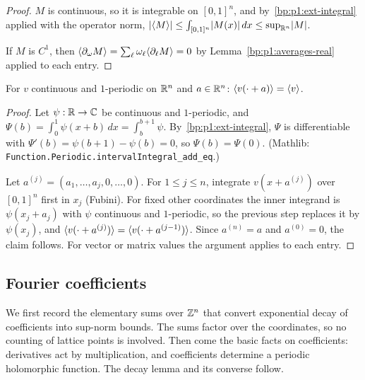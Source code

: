 \begin{proof}
\label{step:p1:am-bound}
$M$ is continuous, so it is integrable on $[0,1]^n$, and by~\ref{bp:p1:ext-integral} applied with the
operator norm, $\lvert \langle M\rangle\rvert\le\int_{[0,1]^n}\lvert M(x)\rvert\,dx\le\sup_{\mathbb{R}^n}\lvert M\rvert$.

\label{step:p1:am-derivative}
If $M$ is $C^1$, then $\langle \partial_\omega M\rangle=\sum_\ell\omega_\ell\langle \partial_\ell M\rangle=0$ by
Lemma~\ref{bp:p1:averages-real} applied to each entry.
\end{proof}

\begin{lemma}\label{bp:p1:periodic-average}
For $v$ continuous and $1$-periodic on $\mathbb{R}^n$ and $a\in\mathbb{R}^n$: $\langle v(\cdot+a)\rangle=\langle v\rangle$.
\end{lemma}

\begin{proof}
\label{step:p1:pa-one}
Let $\psi:\mathbb{R}\to\mathbb{C}$ be continuous and $1$-periodic, and $\Psi(b)=\int_0^1\psi(x+b)\,dx=\int_b^{b+1}\psi$.
By~\ref{bp:p1:ext-integral}, $\Psi$ is differentiable with $\Psi'(b)=\psi(b+1)-\psi(b)=0$, so
$\Psi(b)=\Psi(0)$. (Mathlib: \nolinkurl{Function.Periodic.intervalIntegral_add_eq}.)

\label{step:p1:pa-induction}
Let $a^{(j)}=(a_1,\dots,a_j,0,\dots,0)$. For $1\le j\le n$, integrate $v(x+a^{(j)})$ over $[0,1]^n$ first in
$x_j$ (Fubini). For fixed other coordinates the inner integrand is $\psi(x_j+a_j)$ with $\psi$ continuous
and $1$-periodic, so the previous step replaces it by $\psi(x_j)$, and
$\langle v(\cdot+a^{(j)})\rangle=\langle v(\cdot+a^{(j-1)})\rangle$. Since $a^{(n)}=a$ and $a^{(0)}=0$, the claim follows. For
vector or matrix values the argument applies to each entry.
\end{proof}

\subsection{Fourier coefficients}\label{bp:p1:sec-fourier}

We first record the elementary sums over $\mathbb{Z}^n$ that convert exponential decay of coefficients into
sup-norm bounds. The sums factor over the coordinates, so no counting of lattice points is involved.
Then come the basic facts on coefficients: derivatives act by multiplication, and coefficients determine
a periodic holomorphic function. The decay lemma and its converse follow.

